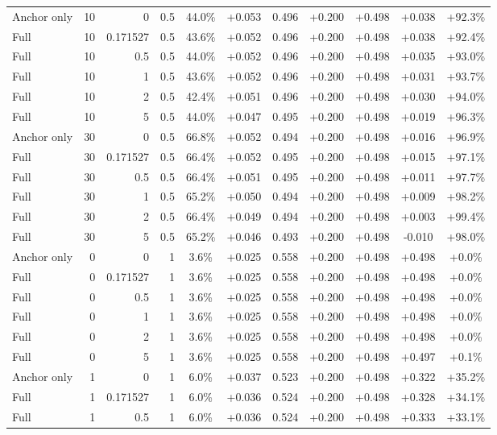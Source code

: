 \begin{table}[htbp]
\begin{tabular}{lrrrccccccc}
Anchor only & 10 & 0 & 0.5 & 44.0\% & +0.053 & 0.496 & +0.200 & +0.498 & +0.038 & +92.3\% \\
Full & 10 & 0.171527 & 0.5 & 43.6\% & +0.052 & 0.496 & +0.200 & +0.498 & +0.038 & +92.4\% \\
Full & 10 & 0.5 & 0.5 & 44.0\% & +0.052 & 0.496 & +0.200 & +0.498 & +0.035 & +93.0\% \\
Full & 10 & 1 & 0.5 & 43.6\% & +0.052 & 0.496 & +0.200 & +0.498 & +0.031 & +93.7\% \\
Full & 10 & 2 & 0.5 & 42.4\% & +0.051 & 0.496 & +0.200 & +0.498 & +0.030 & +94.0\% \\
Full & 10 & 5 & 0.5 & 44.0\% & +0.047 & 0.495 & +0.200 & +0.498 & +0.019 & +96.3\% \\
Anchor only & 30 & 0 & 0.5 & 66.8\% & +0.052 & 0.494 & +0.200 & +0.498 & +0.016 & +96.9\% \\
Full & 30 & 0.171527 & 0.5 & 66.4\% & +0.052 & 0.495 & +0.200 & +0.498 & +0.015 & +97.1\% \\
Full & 30 & 0.5 & 0.5 & 66.4\% & +0.051 & 0.495 & +0.200 & +0.498 & +0.011 & +97.7\% \\
Full & 30 & 1 & 0.5 & 65.2\% & +0.050 & 0.494 & +0.200 & +0.498 & +0.009 & +98.2\% \\
Full & 30 & 2 & 0.5 & 66.4\% & +0.049 & 0.494 & +0.200 & +0.498 & +0.003 & +99.4\% \\
Full & 30 & 5 & 0.5 & 65.2\% & +0.046 & 0.493 & +0.200 & +0.498 & -0.010 & +98.0\% \\
Anchor only & 0 & 0 & 1 & 3.6\% & +0.025 & 0.558 & +0.200 & +0.498 & +0.498 & +0.0\% \\
Full & 0 & 0.171527 & 1 & 3.6\% & +0.025 & 0.558 & +0.200 & +0.498 & +0.498 & +0.0\% \\
Full & 0 & 0.5 & 1 & 3.6\% & +0.025 & 0.558 & +0.200 & +0.498 & +0.498 & +0.0\% \\
Full & 0 & 1 & 1 & 3.6\% & +0.025 & 0.558 & +0.200 & +0.498 & +0.498 & +0.0\% \\
Full & 0 & 2 & 1 & 3.6\% & +0.025 & 0.558 & +0.200 & +0.498 & +0.498 & +0.0\% \\
Full & 0 & 5 & 1 & 3.6\% & +0.025 & 0.558 & +0.200 & +0.498 & +0.497 & +0.1\% \\
Anchor only & 1 & 0 & 1 & 6.0\% & +0.037 & 0.523 & +0.200 & +0.498 & +0.322 & +35.2\% \\
Full & 1 & 0.171527 & 1 & 6.0\% & +0.036 & 0.524 & +0.200 & +0.498 & +0.328 & +34.1\% \\
Full & 1 & 0.5 & 1 & 6.0\% & +0.036 & 0.524 & +0.200 & +0.498 & +0.333 & +33.1\% \\

\end{tabular}
\end{table}
